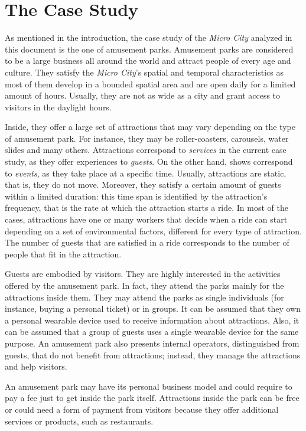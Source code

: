 \section{The Case Study}
\label{sec:case}

As mentioned in the introduction, the case study of the \textit{Micro City} analyzed in this document is the one of amusement parks.
Amusement parks are considered to be a large business all around the world and attract people of every age and culture.
They satisfy the \textit{Micro City}'s spatial and temporal characteristics as most of them develop in a bounded spatial area and are open daily for a limited amount of hours.
Usually, they are not as wide as a city and grant access to visitors in the daylight hours.

Inside, they offer a large set of attractions that may vary depending on the type of amusement park.
For instance, they may be roller-coasters, carousels, water slides and many others.
Attractions correspond to \textit{services} in the current case study, as they offer experiences to \textit{guests}.
On the other hand, shows correspond to \textit{events}, as they take place at a specific time.
Usually, attractions are static, that is, they do not move.
Moreover, they satisfy a certain amount of guests within a limited duration: this time span is identified by the attraction's frequency, that is the rate at which the attraction starts a ride.
In most of the cases, attractions have one or many workers that decide when a ride can start depending on a set of environmental factors, different for every type of attraction.
The number of guests that are satisfied in a ride corresponds to the number of people that fit in the attraction.

Guests are embodied by visitors.
They are highly interested in the activities offered by the amusement park.
In fact, they attend the parks mainly for the attractions inside them.
They may attend the parks as single individuals (for instance, buying a personal ticket) or in groups.
It can be assumed that they own a personal wearable device used to receive information about attractions.
Also, it can be assumed that a group of guests uses a single wearable device for the same purpose.
An amusement park also presents internal operators, distinguished from guests, that do not benefit from attractions;
instead, they manage the attractions and help visitors.

An amusement park may have its personal business model and could require to pay a fee just to get inside the park itself.
Attractions inside the park can be free or could need a form of payment from visitors because they offer additional services or products, such as restaurants.

